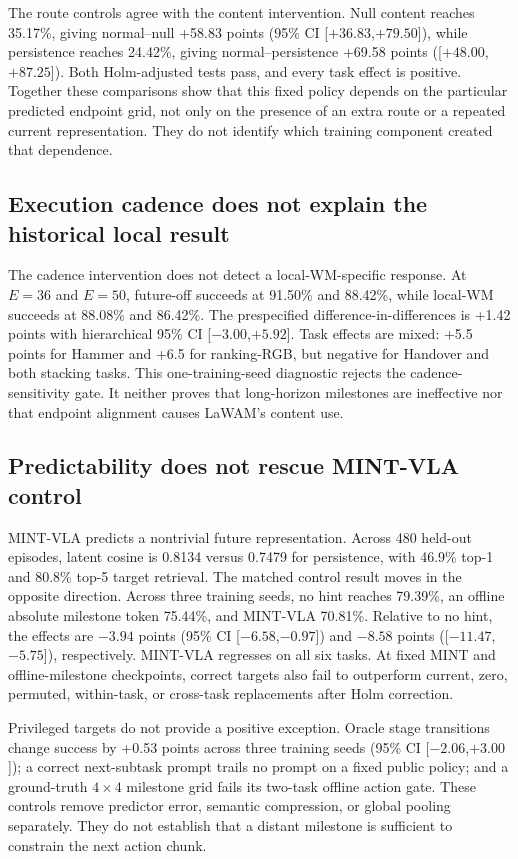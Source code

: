 The route controls agree with the content intervention.  Null content reaches
35.17\%, giving normal--null +58.83 points (95\% CI
[$+36.83$,$+79.50$]), while persistence reaches 24.42\%, giving
normal--persistence +69.58 points ([$+48.00$,$+87.25$]).  Both Holm-adjusted
tests pass, and every task effect is positive.  Together these comparisons show
that this fixed policy depends on the particular predicted endpoint grid, not
only on the presence of an extra route or a repeated current representation.
They do not identify which training component created that dependence.

\subsection{Execution cadence does not explain the historical local result}
The cadence intervention does not detect a local-WM-specific response.  At
$E=36$ and $E=50$, future-off succeeds at 91.50\% and 88.42\%, while local-WM
succeeds at 88.08\% and 86.42\%.  The prespecified difference-in-differences is
+1.42 points with hierarchical 95\% CI [$-3.00$,$+5.92$].  Task effects are
mixed: +5.5 points for Hammer and +6.5 for ranking-RGB, but negative for
Handover and both stacking tasks.  This one-training-seed diagnostic rejects
the cadence-sensitivity gate.  It neither proves that long-horizon milestones
are ineffective nor that endpoint alignment causes LaWAM's content use.

\subsection{Predictability does not rescue MINT-VLA control}
MINT-VLA predicts a nontrivial future representation.  Across 480 held-out
episodes, latent cosine is 0.8134 versus 0.7479 for persistence, with 46.9\%
top-1 and 80.8\% top-5 target retrieval.  The matched control result moves in
the opposite direction.  Across three training seeds, no hint reaches 79.39\%,
an offline absolute milestone token 75.44\%, and MINT-VLA 70.81\%.  Relative to
no hint, the effects are $-3.94$ points (95\% CI
[$-6.58$,$-0.97$]) and $-8.58$ points
([$-11.47$,$-5.75$]), respectively.  MINT-VLA regresses on all six tasks.
At fixed MINT and offline-milestone checkpoints, correct targets also fail to
outperform current, zero, permuted, within-task, or cross-task replacements
after Holm correction.

Privileged targets do not provide a positive exception.  Oracle stage
transitions change success by +0.53 points across three training seeds (95\%
CI [$-2.06$,$+3.00$]); a correct next-subtask prompt trails no prompt on a
fixed public policy; and a ground-truth $4\times4$ milestone grid fails its
two-task offline action gate.  These controls remove predictor error, semantic
compression, or global pooling separately.  They do not establish that a
distant milestone is sufficient to constrain the next action chunk.

